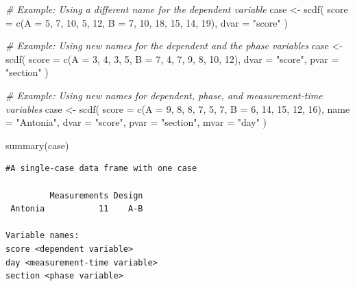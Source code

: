 \documentclass[
]{book}
\newenvironment{Shaded}{\begin{snugshade}}{\end{snugshade}}
\newcommand{\AttributeTok}[1]{\textcolor[rgb]{0.77,0.63,0.00}{#1}}
\newcommand{\CommentTok}[1]{\textcolor[rgb]{0.56,0.35,0.01}{\textit{#1}}}
\newcommand{\DecValTok}[1]{\textcolor[rgb]{0.00,0.00,0.81}{#1}}
\newcommand{\FunctionTok}[1]{\textcolor[rgb]{0.00,0.00,0.00}{#1}}
\newcommand{\NormalTok}[1]{#1}
\newcommand{\OtherTok}[1]{\textcolor[rgb]{0.56,0.35,0.01}{#1}}
\newcommand{\StringTok}[1]{\textcolor[rgb]{0.31,0.60,0.02}{#1}}
\begin{document}
\begin{Shaded}
\begin{Highlighting}[]
\CommentTok{\# Example: Using a different name for the dependent variable}
\NormalTok{case }\OtherTok{\textless{}{-}} \FunctionTok{scdf}\NormalTok{(}
  \AttributeTok{score =} \FunctionTok{c}\NormalTok{(}\AttributeTok{A =} \DecValTok{5}\NormalTok{, }\DecValTok{7}\NormalTok{, }\DecValTok{10}\NormalTok{, }\DecValTok{5}\NormalTok{, }\DecValTok{12}\NormalTok{, }\AttributeTok{B =} \DecValTok{7}\NormalTok{, }\DecValTok{10}\NormalTok{, }\DecValTok{18}\NormalTok{, }\DecValTok{15}\NormalTok{, }\DecValTok{14}\NormalTok{, }\DecValTok{19}\NormalTok{), }
  \AttributeTok{dvar =} \StringTok{"score"}
\NormalTok{)}

\CommentTok{\# Example: Using new names for the dependent and the phase variables}
\NormalTok{case }\OtherTok{\textless{}{-}} \FunctionTok{scdf}\NormalTok{(}
  \AttributeTok{score =} \FunctionTok{c}\NormalTok{(}\AttributeTok{A =} \DecValTok{3}\NormalTok{, }\DecValTok{4}\NormalTok{, }\DecValTok{3}\NormalTok{, }\DecValTok{5}\NormalTok{, }\AttributeTok{B =} \DecValTok{7}\NormalTok{, }\DecValTok{4}\NormalTok{, }\DecValTok{7}\NormalTok{, }\DecValTok{9}\NormalTok{, }\DecValTok{8}\NormalTok{, }\DecValTok{10}\NormalTok{, }\DecValTok{12}\NormalTok{), }
  \AttributeTok{dvar =} \StringTok{"score"}\NormalTok{, }\AttributeTok{pvar =} \StringTok{"section"}
\NormalTok{)}

\CommentTok{\# Example: Using new names for dependent, phase, and measurement{-}time variables}
\NormalTok{case }\OtherTok{\textless{}{-}} \FunctionTok{scdf}\NormalTok{(}
  \AttributeTok{score =} \FunctionTok{c}\NormalTok{(}\AttributeTok{A =} \DecValTok{9}\NormalTok{, }\DecValTok{8}\NormalTok{, }\DecValTok{8}\NormalTok{, }\DecValTok{7}\NormalTok{, }\DecValTok{5}\NormalTok{, }\DecValTok{7}\NormalTok{, }\AttributeTok{B =} \DecValTok{6}\NormalTok{, }\DecValTok{14}\NormalTok{, }\DecValTok{15}\NormalTok{, }\DecValTok{12}\NormalTok{, }\DecValTok{16}\NormalTok{), }
  \AttributeTok{name =} \StringTok{"Antonia"}\NormalTok{, }\AttributeTok{dvar =} \StringTok{"score"}\NormalTok{, }\AttributeTok{pvar =} \StringTok{"section"}\NormalTok{, }\AttributeTok{mvar =} \StringTok{"day"}
\NormalTok{)}

\FunctionTok{summary}\NormalTok{(case)}
\end{Highlighting}
\end{Shaded}

\begin{verbatim}
#A single-case data frame with one case

         Measurements Design
 Antonia           11    A-B

Variable names:
score <dependent variable>
day <measurement-time variable>
section <phase variable>
\end{verbatim}
\end{document}
